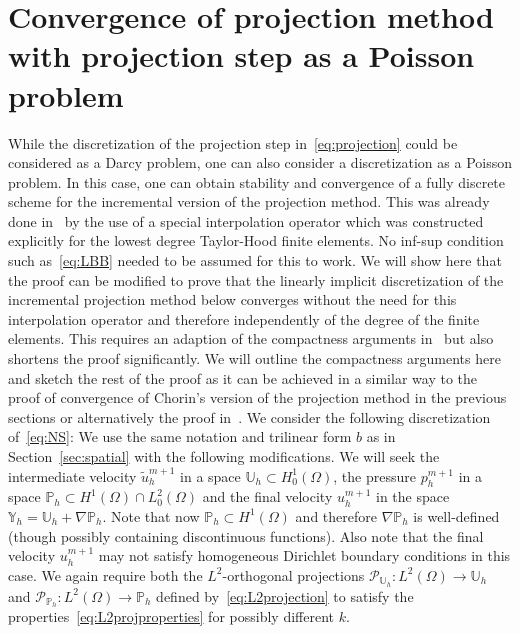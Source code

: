 \documentclass[10pt,letterpaper]{amsart}
\newcommand{\tu}{\widetilde{u}}
\newcommand{\Grad}{\nabla}
\newcommand{\dom}{\Omega}
\newcommand{\Ph}{\mathbb{P}_h}
\newcommand{\Yh}{\mathbb{Y}_h}
\newcommand{\Uh}{\mathbb{U}_h}
\newcommand{\PUh}{\mathcal{P}_{\Uh}}
\newcommand{\PPh}{\mathcal{P}_{\Ph}}
\theoremstyle{definition}{\newtheorem{definition}[lemma]{Definition}}
\numberwithin{equation}{section}
\begin{document}
\section{Convergence of projection method with projection step as a Poisson problem}\label{sec:poisson}
While the discretization of the projection step in~\eqref{eq:projection} could be considered as a Darcy problem, one can also consider a discretization as a Poisson problem. In this case, one can obtain stability and convergence of a fully discrete scheme for the incremental version of the projection method. This was already done in~\cite{Eymard2024} by the use of a special interpolation operator which was constructed explicitly for the lowest degree Taylor-Hood finite elements. No inf-sup condition such as~\eqref{eq:LBB} needed to be assumed for this to work. We will show here that the proof can be modified to prove that the linearly implicit discretization of the incremental projection method below converges without the need for this interpolation operator and therefore independently of the degree of the finite elements. This requires an adaption of the compactness arguments in~\cite{Eymard2024} but also shortens the proof significantly. We will outline the compactness arguments here and sketch the rest of the proof as it can be achieved in a similar way to the proof of convergence of Chorin's version of the projection method in the previous sections or alternatively the proof in~\cite{Eymard2024}.
We consider the following discretization of~\eqref{eq:NS}: We use the same notation and trilinear form $b$ as in Section~\ref{sec:spatial} with the following modifications. We will seek the intermediate velocity $\tu_h^{m+1}$ in a space $\Uh\subset H^1_0(\dom)$, the pressure $p_h^{m+1}$ in a space $\Ph\subset H^1(\dom)\cap L^2_0(\dom)$ and the final velocity $u_h^{m+1}$ in the space $\Yh = \Uh + \Grad \Ph$. Note that now $\Ph\subset H^1(\dom)$ and therefore $\Grad \Ph$ is well-defined (though possibly containing discontinuous functions). Also note that the final velocity $u_h^{m+1}$ may not satisfy homogeneous Dirichlet boundary conditions in this case.  We again require both the $L^2$-orthogonal projections $\PUh:L^2(\dom)\to \Uh$ and $\PPh:L^2(\dom)\to \Ph$ defined by~\eqref{eq:L2projection} to satisfy the properties~\eqref{eq:L2projproperties} for possibly different $k$. 
\end{document}
